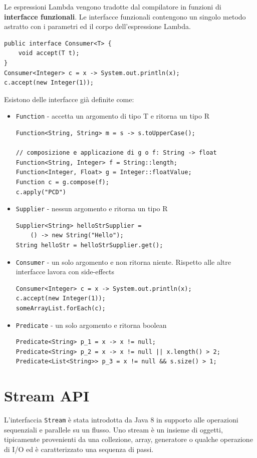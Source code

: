 Le espressioni Lambda vengono tradotte dal compilatore in funzioni di \textbf{interfacce funzionali}. Le interfacce funzionali contengono un singolo metodo astratto con i parametri ed il corpo dell'espressione Lambda. 

\begin{lstlisting}
public interface Consumer<T> {
	void accept(T t);
}
Consumer<Integer> c = x -> System.out.println(x);
c.accept(new Integer(1));	
\end{lstlisting}

Esistono delle interfacce già definite come:
\begin{itemize}
\item \texttt{Function} - accetta un argomento di tipo T e ritorna un tipo R
	\begin{lstlisting}
Function<String, String> m = s -> s.toUpperCase();

// composizione e applicazione di g o f: String -> float
Function<String, Integer> f = String::length;
Function<Integer, Float> g = Integer::floatValue;
Function c = g.compose(f);
c.apply("PCD")
	\end{lstlisting}
\item \texttt{Supplier} - nessun argomento e ritorna un tipo R
	\begin{lstlisting}
Supplier<String> helloStrSupplier =
	() -> new String("Hello");
String helloStr = helloStrSupplier.get();
	\end{lstlisting}
\item \texttt{Consumer}   - un solo argomento e non ritorna niente. Rispetto alle altre interfacce lavora con side-effects
	\begin{lstlisting}
Consumer<Integer> c = x -> System.out.println(x);
c.accept(new Integer(1));	
someArrayList.forEach(c);
	\end{lstlisting}
\item \texttt{Predicate} - un solo argomento e ritorna boolean 
	\begin{lstlisting}
Predicate<String> p_1 = x -> x != null;
Predicate<String> p_2 = x -> x != null || x.length() > 2;
Predicate<List<String>> p_3 = x != null && s.size() > 1;
	\end{lstlisting}
\end{itemize}

\section{Stream API}
L'interfaccia \texttt{Stream} è stata introdotta da Java 8 in supporto alle operazioni sequenziali e parallele su un flusso. Uno stream \`e un insieme di oggetti, tipicamente provenienti da una collezione, array, generatore o qualche operazione di I/O ed è caratterizzato una sequenza di passi.

